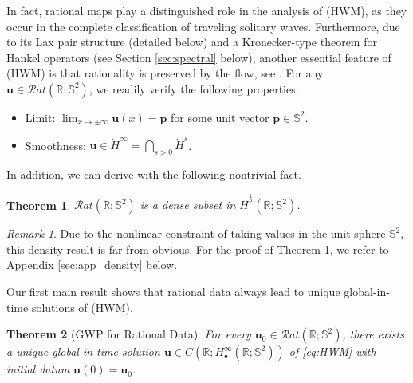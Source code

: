\documentclass[11pt,reqno]{amsart}
\newtheorem{thm}{Theorem}[section]
\theoremstyle{definition}
\theoremstyle{remark}
\theoremstyle{remark}
\newtheorem*{remark*}{Remark}
\numberwithin{equation}{section}
\newcommand{\R}{\mathbb{R}}
\newcommand{\Ss}{\mathbb{S}}
\newcommand{\uu}{\mathbf{u}}
\begin{document}
In fact, rational maps play a distinguished role in the analysis of (HWM), as they occur in the complete classification of traveling solitary waves. Furthermore, due to its Lax pair structure (detailed below) and a Kronecker-type theorem for Hankel operators (see Section \ref{sec:spectral} below), another essential feature of (HWM) is that rationality is preserved by the flow, see \cite{GeLe-18}. For any $\uu \in \mathcal{R}at(\R; \Ss^2)$, we readily verify the following properties:
\begin{itemize}
\item Limit: $\displaystyle \lim_{x \to \pm \infty} \uu(x) = \mathbf{p}$ for some unit vector $\mathbf{p} \in \Ss^2$.
\item Smoothness: $\uu \in \dot{H}^\infty = \bigcap_{s >0} \dot{H}^s$. 
\end{itemize}
In addition, we can derive with the following nontrivial fact.

\begin{thm}\label{thm:dense_rational}
$\mathcal{R}at(\R; \Ss^2)$ is a dense subset in $\dot{H}^{\frac 1 2}(\R; \Ss^2)$.
\end{thm}

\begin{remark*}
Due to the nonlinear constraint of taking values in the unit sphere $\Ss^2$, this density result is far from obvious. For the proof of Theorem \ref{thm:dense_rational}, we refer to Appendix \ref{sec:app_density} below. 
\end{remark*}

Our first main result shows that rational data always lead to unique global-in-time solutions of (HWM).

\begin{thm}[GWP for Rational Data] \label{thm:gwp_S2}
For every $\uu_0 \in \mathcal{R}at(\R; \Ss^2)$, there exists a unique global-in-time solution $\uu \in C(\R; H^\infty_\bullet(\R; \Ss^2))$ of \eqref{eq:HWM} with initial datum $\uu(0) = \uu_0$.
\end{thm}
\end{document}
